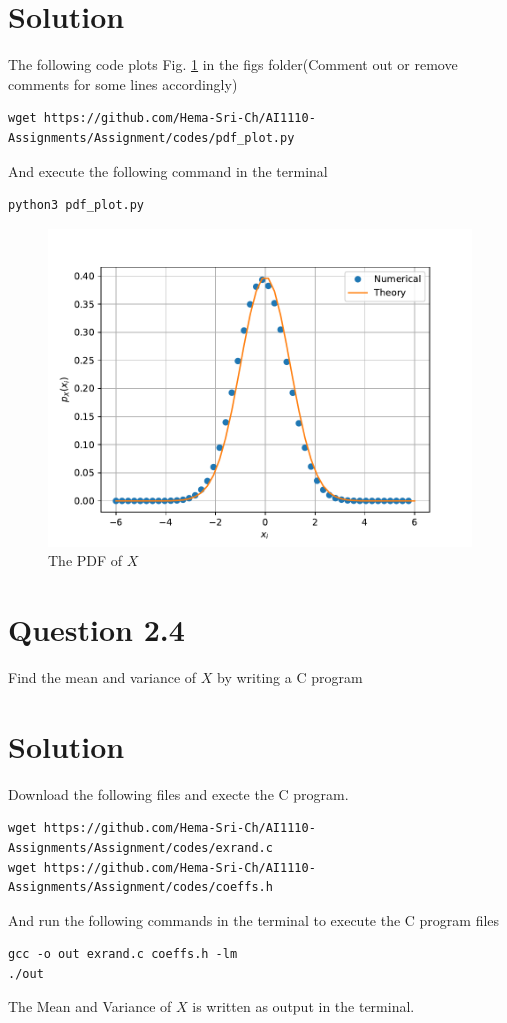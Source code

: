 \documentclass[16pt, a4paper, two column]{article}
\begin{document}
\section*{Solution}
The following code plots Fig. \ref{fig:gauss_pdf} in the figs folder(Comment out or remove comments for some lines accordingly)
\begin{lstlisting}
wget https://github.com/Hema-Sri-Ch/AI1110-Assignments/Assignment/codes/pdf_plot.py
\end{lstlisting}
And execute the following command in the terminal 
\begin{lstlisting}
python3 pdf_plot.py
\end{lstlisting}
\begin{figure}[h]
	\centering
	\includegraphics[width=\columnwidth]{gauss_pdf}
	\caption{The PDF of $X$}
	\label{fig:gauss_pdf}
\end{figure}

\section*{Question 2.4}
Find the mean and variance of $X$ by writing a C program
\section*{Solution}
Download the following files and execte the C program.
\begin{lstlisting}
wget https://github.com/Hema-Sri-Ch/AI1110-Assignments/Assignment/codes/exrand.c
wget https://github.com/Hema-Sri-Ch/AI1110-Assignments/Assignment/codes/coeffs.h
\end{lstlisting}
And run the following commands in the terminal to execute the C program files
\begin{lstlisting}
gcc -o out exrand.c coeffs.h -lm
./out
\end{lstlisting}
The Mean and Variance of $X$ is written as output in the terminal.
\end{document}
